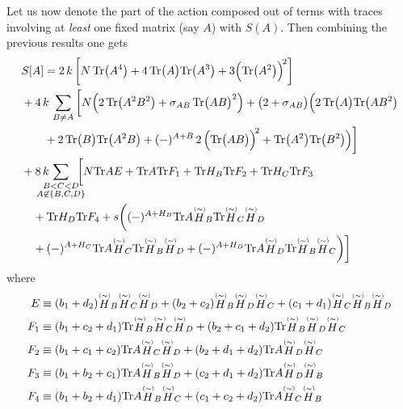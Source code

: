 \documentclass[10pt,a4paper]{article}
\newcommand\ptwid[1]{\mathord{\mathop{#1}\limits^{\scriptscriptstyle(\sim)}}}
\newcommand{\Tr}{\mathrm{Tr}\vspace{-2pt}}
\begin{document}
Let us now denote the part of the action composed out of terms with traces
involving at \textit{least} one fixed matrix (say $A$) with $S(A)$.
Then combining the previous results one gets
\begin{align}
  &S[A] =
  2 \, k \,
  \bigg[
      N \, \Tr \big( A^4 \big)
    + 4 \, \Tr \big( A \big) \Tr \big( A^3 \big)
    + 3 \Big( \Tr \big( A^2 \big) \Big)^{\! 2}
  \bigg]
  \nonumber \\
  &+ 4 \, k \,
  \sum_{B \neq A}
  \bigg[
    N
    \Big(
      2 \, \Tr \big( A^2 B^2 \big)
      + \sigma_{AB} \, \Tr \big( A B \big)^2
    \Big)
    + \big( 2 + \sigma_{AB} \big)
    \Big(
      2 \, \Tr \big( A \big) \Tr \big( A B^2 \big)
      \nonumber \\
      &\qquad+ 2 \,  \Tr \big( B \big) \Tr \big( A^2 B \big)
      + (-)^{A+B} \, 2 \, \Big( \Tr \big( A B \big) \Big)^{\! 2}
      + \Tr \big( A^2 \big) \Tr \big( B^2 \big)
    \Big)
  \bigg]
  \nonumber \\
  &+ 8 \, k \,
  \sum_{\mathclap{\substack{B < C < D\\A \not \in \{B,C,D\} }}}
  \;\;
  \bigg[
    N \Tr A E +
    \Tr A \Tr F_1 +
    \Tr H_B \Tr F_2 +
    \Tr H_C \Tr F_3
    \nonumber \\
    &\quad+
    \Tr H_D \Tr F_4 +
    s \bigg(
      (-)^{A+H_B} \Tr A \ptwid H_B \Tr \ptwid H_C \ptwid H_D
      \nonumber \\
      &\quad+     (-)^{A+H_C} \Tr A \ptwid H_C \Tr \ptwid H_B \ptwid H_D +
      (-)^{A+H_D} \Tr A \ptwid H_D \Tr \ptwid H_B \ptwid H_C
    \bigg)
  \bigg]
\end{align}
where
\begin{align}
  E &\equiv
  (b_1 + d_2) \ptwid H_B \ptwid H_C \ptwid H_D +
  (b_2 + c_2) \ptwid H_B \ptwid H_D \ptwid H_C +
  (c_1 + d_1) \ptwid H_C \ptwid H_B \ptwid H_D \\
  F_1 &\equiv
    (b_1+c_2+d_1) \Tr \ptwid H_B \ptwid H_C \ptwid H_D +
    (b_2+c_1+d_2) \Tr \ptwid H_B \ptwid H_D \ptwid H_C \\
  F_2 &\equiv
    (b_1+c_1+c_2) \Tr A \ptwid H_C \ptwid H_D +
    (b_2+d_1+d_2) \Tr A \ptwid H_D \ptwid H_C \\
  F_3 &\equiv
    (b_1+b_2+c_1) \Tr A \ptwid H_B \ptwid H_D +
    (c_2+d_1+d_2) \Tr A \ptwid H_D \ptwid H_B \\
  F_4 &\equiv
    (b_1+b_2+d_1) \Tr A \ptwid H_B \ptwid H_C +
    (c_1+c_2+d_2) \Tr A \ptwid H_C \ptwid H_B
\end{align}
\end{document}
